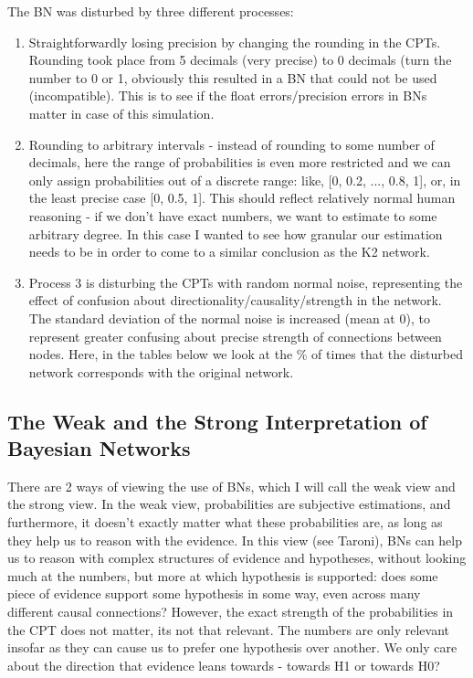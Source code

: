 \documentclass[11pt]{amsart}
\begin{document}
The BN was disturbed by three different processes:

\begin{enumerate}

\item Straightforwardly losing precision by changing the rounding in the CPTs. Rounding took place from 5 decimals (very precise) to 0 decimals (turn the number to 0 or 1, obviously this resulted in a BN that could not be used (incompatible). This is to see if the float errors/precision errors in BNs matter in case of this simulation.

\item Rounding to arbitrary intervals - instead of rounding to some number of decimals, here the range of probabilities is even more restricted and we can only assign probabilities out of a discrete range: like, [0, 0.2, ..., 0.8, 1], or, in the least precise case [0, 0.5, 1]. This should reflect relatively normal human reasoning - if we don't have exact numbers, we want to estimate to some arbitrary degree. In this case I wanted to see how granular our estimation needs to be in order to come to a similar conclusion as the K2 network. 

\item Process 3 is disturbing the CPTs with random normal noise, representing the effect of confusion about directionality/causality/strength in the network. The standard deviation of the normal noise is increased (mean at 0), to represent greater confusing about precise strength of connections between nodes. Here, in the tables below we look at the \% of times that the disturbed network corresponds with the original network.
\end{enumerate}

\subsection{The Weak and the Strong Interpretation of Bayesian Networks}
There are 2 ways of viewing the use of BNs, which I will call the weak view and the strong view. In the weak view, probabilities are subjective estimations, and furthermore, it doesn't exactly matter what these probabilities are, as long as they help us to reason with the evidence. In this view (see Taroni), BNs can help us to reason with complex structures of evidence and hypotheses, without looking much at the numbers, but more at which hypothesis is supported: does some piece of evidence support some hypothesis in some way, even across many different causal connections? However, the exact strength of the probabilities in the CPT does not matter, its not that relevant. The numbers are only relevant insofar as they can cause us to prefer one hypothesis over another. We only care about the direction that evidence leans towards - towards H1 or towards H0?
\end{document}
